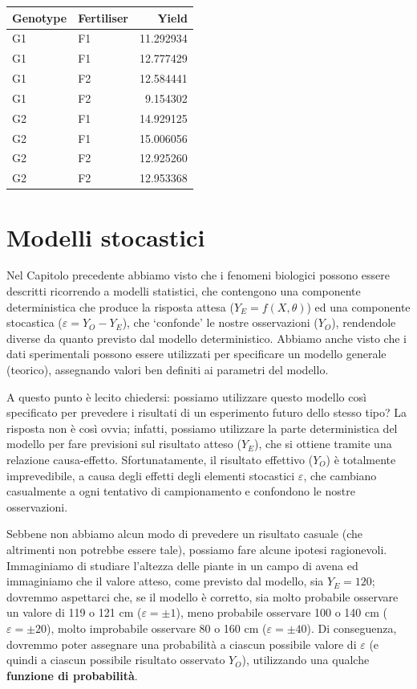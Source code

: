 \documentclass[
  12pt,
]{book}
\begin{document}
\begin{longtable}[]{@{}llr@{}}
\toprule()
Genotype & Fertiliser & Yield \\
\midrule()
\endhead
G1 & F1 & 11.292934 \\
G1 & F1 & 12.777429 \\
G1 & F2 & 12.584441 \\
G1 & F2 & 9.154302 \\
G2 & F1 & 14.929125 \\
G2 & F1 & 15.006056 \\
G2 & F2 & 12.925260 \\
G2 & F2 & 12.953368 \\
\bottomrule()
\end{longtable}

\hypertarget{modelli-stocastici}{%
\chapter{Modelli stocastici}\label{modelli-stocastici}}

Nel Capitolo precedente abbiamo visto che i fenomeni biologici possono essere descritti ricorrendo a modelli statistici, che contengono una componente deterministica che produce la risposta attesa (\(Y_E = f(X, \theta)\)) ed una componente stocastica (\(\varepsilon = Y_O - Y_E\)), che `confonde' le nostre osservazioni (\(Y_O\)), rendendole diverse da quanto previsto dal modello deterministico. Abbiamo anche visto che i dati sperimentali possono essere utilizzati per specificare un modello generale (teorico), assegnando valori ben definiti ai parametri del modello.

A questo punto è lecito chiedersi: possiamo utilizzare questo modello così specificato per prevedere i risultati di un esperimento futuro dello stesso tipo? La risposta non è così ovvia; infatti, possiamo utilizzare la parte deterministica del modello per fare previsioni sul risultato atteso (\(Y_E\)), che si ottiene tramite una relazione causa-effetto. Sfortunatamente, il risultato effettivo (\(Y_O\)) è totalmente imprevedibile, a causa degli effetti degli elementi stocastici \(\varepsilon\), che cambiano casualmente a ogni tentativo di campionamento e confondono le nostre osservazioni.

Sebbene non abbiamo alcun modo di prevedere un risultato casuale (che altrimenti non potrebbe essere tale), possiamo fare alcune ipotesi ragionevoli. Immaginiamo di studiare l'altezza delle piante in un campo di avena ed immaginiamo che il valore atteso, come previsto dal modello, sia \(Y_E = 120\); dovremmo aspettarci che, se il modello è corretto, sia molto probabile osservare un valore di 119 o 121 cm (\(\varepsilon = \pm 1\)), meno probabile osservare 100 o 140 cm (\(\varepsilon = \pm 20\)), molto improbabile osservare 80 o 160 cm (\(\varepsilon = \pm 40\)). Di conseguenza, dovremmo poter assegnare una probabilità a ciascun possibile valore di \(\varepsilon\) (e quindi a ciascun possibile risultato osservato \(Y_O\)), utilizzando una qualche \textbf{funzione di probabilità}.
\end{document}

